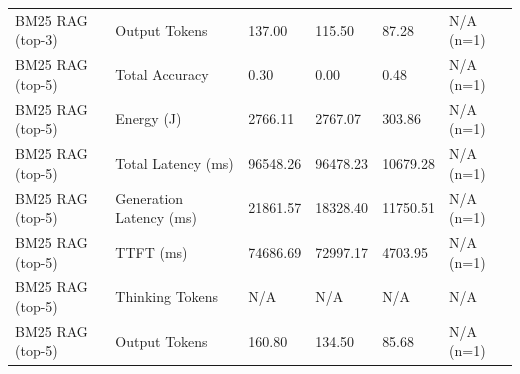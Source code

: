 \begin{table}
\begin{tabular}{llllll}
BM25 RAG (top-3) & Output Tokens & 137.00 & 115.50 & 87.28 & N/A (n=1) \\
BM25 RAG (top-5) & Total Accuracy & 0.30 & 0.00 & 0.48 & N/A (n=1) \\
BM25 RAG (top-5) & Energy (J) & 2766.11 & 2767.07 & 303.86 & N/A (n=1) \\
BM25 RAG (top-5) & Total Latency (ms) & 96548.26 & 96478.23 & 10679.28 & N/A (n=1) \\
BM25 RAG (top-5) & Generation Latency (ms) & 21861.57 & 18328.40 & 11750.51 & N/A (n=1) \\
BM25 RAG (top-5) & TTFT (ms) & 74686.69 & 72997.17 & 4703.95 & N/A (n=1) \\
BM25 RAG (top-5) & Thinking Tokens & N/A & N/A & N/A & N/A \\
BM25 RAG (top-5) & Output Tokens & 160.80 & 134.50 & 85.68 & N/A (n=1) \\
\bottomrule
\end{tabular}
\end{table}
